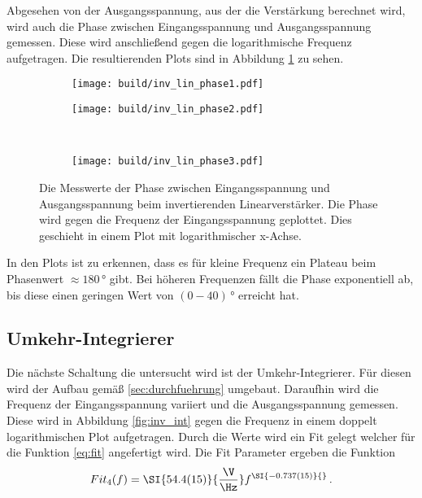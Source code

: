 Abgesehen von der Ausgangsspannung, aus der die Verstärkung berechnet wird, wird auch die Phase zwischen Eingangsspannung und Ausgangsspannung gemessen.
Diese wird anschließend gegen die logarithmische  Frequenz aufgetragen.
Die resultierenden Plots sind in Abbildung \ref{fig:phase} zu sehen.
\begin{figure}[H]
    \centering
    \begin{subfigure}{0.49\linewidth}%
        \texttt{[image: build/inv\_lin\_phase1.pdf]}
    \end{subfigure}
    \hfill
    \begin{subfigure}{0.49\linewidth}%
        \texttt{[image: build/inv\_lin\_phase2.pdf]}
    \end{subfigure}\\
    \begin{subfigure}{0.49\linewidth}%
        \texttt{[image: build/inv\_lin\_phase3.pdf]}
    \end{subfigure}
    \caption{Die Messwerte der Phase zwischen Eingangsspannung und Ausgangsspannung beim invertierenden Linearverstärker. Die Phase wird gegen die Frequenz der Eingangsspannung geplottet.
    Dies geschieht in einem Plot mit logarithmischer x-Achse.}
    \label{fig:phase}
\end{figure}
In den Plots ist zu erkennen, dass es für kleine Frequenz ein Plateau beim Phasenwert $\approx 180\,\si{\degree}$ gibt.
Bei höheren Frequenzen fällt die Phase exponentiell ab, bis diese einen geringen Wert von $(0-40)\,\si{\degree}$ erreicht hat.
\FloatBarrier
\subsection{Umkehr-Integrierer}
Die nächste Schaltung die untersucht wird ist der Umkehr-Integrierer.
Für diesen wird der Aufbau gemäß \ref{sec:durchfuehrung} umgebaut.
Daraufhin wird die Frequenz der Eingangsspannung variiert und die Ausgangsspannung gemessen.
Diese wird in Abbildung \ref{fig:inv_int} gegen die Frequenz in einem doppelt logarithmischen Plot aufgetragen.
Durch die Werte wird ein Fit gelegt welcher für die Funktion \eqref{eq:fit} angefertigt wird.
Die Fit Parameter ergeben die Funktion
\begin{align*}
    Fit_4(f) = \SI{54.4(15)}{\frac{\V}{\Hz}} f^{\SI{-0.737(15)}{}} \, .
\end{align*}

